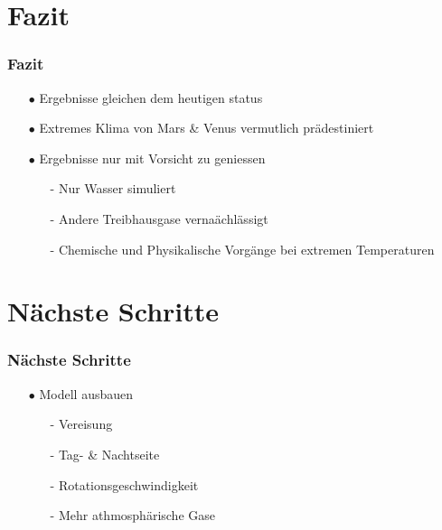 \documentclass[ngerman]{beamer}
\begin{document}
\section{Fazit}
\begin{frame}
\frametitle{Fazit}
\begin{itemize}

	\item[$\bullet$] Ergebnisse gleichen dem heutigen status
	\item[$\bullet$] Extremes Klima von Mars \& Venus vermutlich prädestiniert
	
	\vspace{5mm}
	
	\item[$\bullet$] Ergebnisse nur mit Vorsicht zu geniessen	
	\begin{itemize}
		\item[-] Nur Wasser simuliert
		\item[-] Andere Treibhausgase vernaächlässigt
		\item[-] Chemische und Physikalische Vorgänge bei extremen Temperaturen
	\end{itemize}

	
\end{itemize}
\end{frame}

\section{Nächste Schritte}
\begin{frame}
\frametitle{Nächste Schritte}
\begin{itemize}

	\item[$\bullet$] Modell ausbauen
	\begin{itemize}
		\item[-] Vereisung
		\item[-] Tag- \& Nachtseite
		\item[-] Rotationsgeschwindigkeit
		\item[-] Mehr athmosphärische Gase
	\end{itemize}
	
\end{itemize}
\end{frame}
\end{document}
